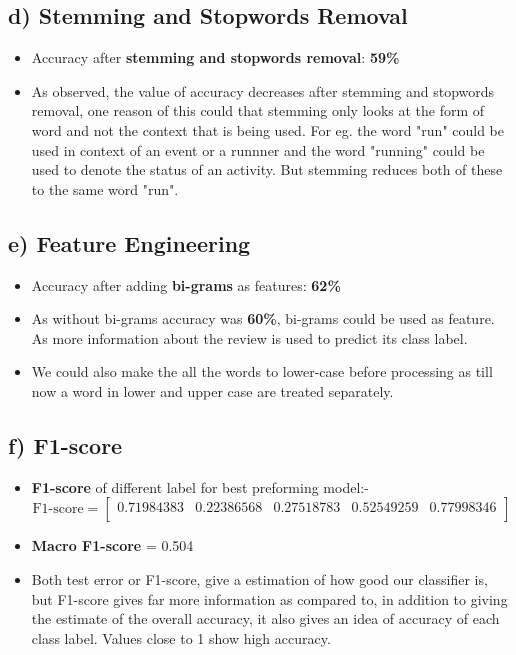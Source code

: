 \documentclass[12pt,letterpaper]{article}
\begin{document}
\subsection*{d) Stemming and Stopwords Removal}
\begin{itemize}
    \item Accuracy after \textbf{stemming and stopwords removal}: \textbf{59\%}
    \item As observed, the value of accuracy decreases after stemming and stopwords removal, one reason of this could that stemming only looks at the form of word and not the context that is being used. For eg. the word "run" could be used in context of an event or a runnner and the word "running" could be used to denote the status of an activity. But stemming reduces both of these to the same word "run". 
\end{itemize}
\subsection*{e) Feature Engineering}
\begin{itemize}
    \item Accuracy after adding \textbf{bi-grams} as features: \textbf{62\%}
    \item As without bi-grams accuracy was \textbf{60\%}, bi-grams could be used as feature. As more information about the review is used to predict its class label.
    \item We could also make the all the words to lower-case before processing as till now a word in lower and upper case are treated separately.
\end{itemize}
\subsection*{f) F1-score}
\begin{itemize}
    \item \textbf{F1-score} of different label for best preforming model:-
    \[
      \text{F1-score}
    =
    \begin{bmatrix}
        0.71984383 & 0.22386568 & 0.27518783 & 0.52549259 &  0.77998346 \\
    \end{bmatrix}
    \]
    \item \textbf{Macro F1-score} = 0.504
    \item Both test error or F1-score, give a estimation of how good our classifier is, but F1-score gives far more information as compared to, in addition to giving the estimate of the overall accuracy, it also gives an idea of accuracy of each class label. Values close to 1 show high accuracy. 
\end{itemize}
\end{document}
